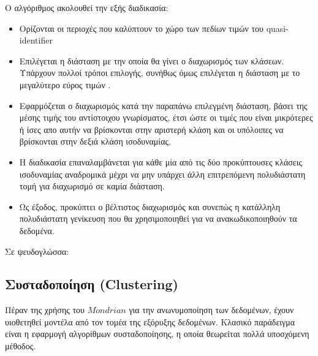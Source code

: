Ο αλγόριθμος ακολουθεί την εξής διαδικασία:
\begin{itemize}
    \item Ορίζονται οι περιοχές που καλύπτουν το χώρο των πεδίων τιμών  του \textlatin{quasi-identifier}
    \item Επιλέγεται η διάσταση με την οποία θα γίνει ο διαχωρισμός των κλάσεων. Υπάρχουν πολλοί τρόποι επιλογής, συνήθως όμως επιλέγεται η διάσταση με το μεγαλύτερο εύρος τιμών .
    \item Εφαρμόζεται ο διαχωρισμός κατά την παραπάνω επιλεγμένη διάσταση, βάσει της μέσης τιμής του αντίστοιχου γνωρίσματος, έτσι ώστε οι τιμές που είναι μικρότερες ή ίσες απο αυτήν να βρίσκονται στην αριστερή κλάση και οι υπόλοιπες να βρίσκονται στην δεξιά κλάση ισοδυναμίας.
    \item Η διαδικασία επαναλαμβάνεται για κάθε μία από τις δύο προκύπτουσες κλάσεις ισοδυναμίας αναδρομικά μέχρι να μην υπάρχει άλλη επιτρεπόμενη πολυδιάστατη τομή για διαχωρισμό σε καμία διάσταση. 
    \item Ως έξοδος, προκύπτει ο βέλτιστος διαχωρισμός και συνεπώς η κατάλληλη πολυδιάστατη γενίκευση που θα χρησιμοποιηθεί για να ανακωδικοποιηθούν τα δεδομένα.
\end{itemize}

Σε ψευδογλώσσα:





\subsection{Συσταδοποίηση (\textlatin{Clustering})}

Πέραν της χρήσης του $Mondrian$ για την ανωνυμοποίηση των δεδομένων, έχουν υιοθετηθεί μοντέλα από τον τομέα της εξόρυξης δεδομένων. Κλασικό παράδειγμα είναι η εφαρμογή αλγορίθμων συσταδοποίησης, η οποία θεωρείται πολλά υποσχόμενη μέθοδος.

